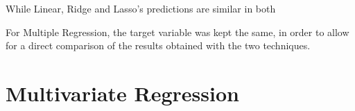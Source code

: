 While Linear, Ridge and Lasso's predictions are similar in both 

For Multiple Regression, the target variable was kept the same, in order to
allow for a direct comparison of the results obtained with the two techniques.


\section{Multivariate Regression}
